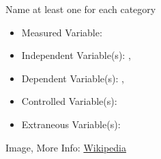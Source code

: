 \documentclass[fleqn]{beamer} %
\begin{document}
\begin{frame}[label=sectionV]
\begin{multicols}{2}
		    Name at least one for each category 
	
			\begin{itemize}
				\item Measured Variable: \hspcu \vspc 
				\item Independent Variable(s): \hspcu, \hspcu \vspc
				\item Dependent Variable(s): \hspcu, \hspcu \vspc 
				\item Controlled Variable(s): \hspcu \vspc 
				\item Extraneous Variable(s):\hspcu \vspc
			\end{itemize}
			
			\end{multicols}	

			{\tiny Image, More Info: \href{https://en.wikipedia.org/wiki/Thermocouple}{Wikipedia} }\hspace{40mm} 

	\end{frame}
\end{document}
